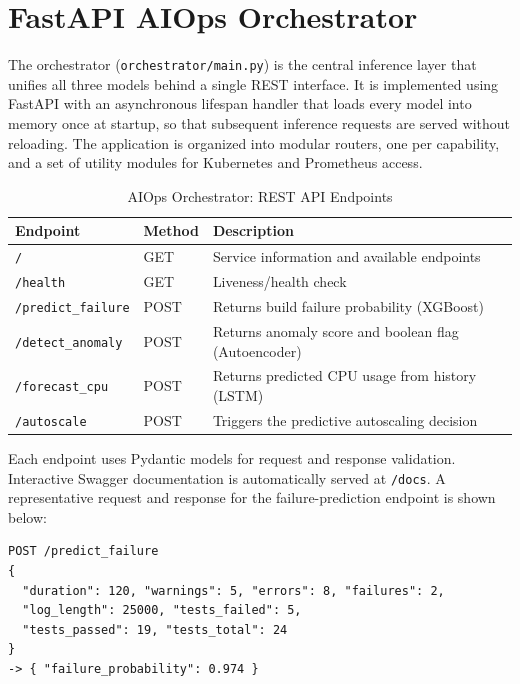 \documentclass[12pt]{report}
\begin{document}
\section{FastAPI AIOps Orchestrator}

The orchestrator (\texttt{orchestrator/main.py}) is the central inference layer that unifies all three models behind a single REST interface. It is implemented using FastAPI with an asynchronous lifespan handler that loads every model into memory once at startup, so that subsequent inference requests are served without reloading. The application is organized into modular routers, one per capability, and a set of utility modules for Kubernetes and Prometheus access.

\begin{table}[H]
\centering
\caption{AIOps Orchestrator: REST API Endpoints}
\label{table:api_endpoints}
\begin{tabular}{|l|l|p{6.2cm}|}
\hline
\textbf{Endpoint} & \textbf{Method} & \textbf{Description} \\
\hline
\texttt{/} & GET & Service information and available endpoints \\
\hline
\texttt{/health} & GET & Liveness/health check \\
\hline
\texttt{/predict\_failure} & POST & Returns build failure probability (XGBoost) \\
\hline
\texttt{/detect\_anomaly} & POST & Returns anomaly score and boolean flag (Autoencoder) \\
\hline
\texttt{/forecast\_cpu} & POST & Returns predicted CPU usage from history (LSTM) \\
\hline
\texttt{/autoscale} & POST & Triggers the predictive autoscaling decision \\
\hline
\end{tabular}
\end{table}

Each endpoint uses Pydantic models for request and response validation. Interactive Swagger documentation is automatically served at \texttt{/docs}. A representative request and response for the failure-prediction endpoint is shown below:

\begin{lstlisting}
POST /predict_failure
{
  "duration": 120, "warnings": 5, "errors": 8, "failures": 2,
  "log_length": 25000, "tests_failed": 5,
  "tests_passed": 19, "tests_total": 24
}
-> { "failure_probability": 0.974 }
\end{lstlisting}
\end{document}
